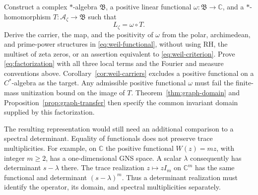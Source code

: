 \documentclass[11pt]{article}
\numberwithin{equation}{section}
\newcommand{\cA}{\mathcal A}
\newcommand{\C}{\mathbb C}
\begin{document}
\begin{openproblem}
Construct a complex $*$-algebra $\mathfrak B$, a positive linear
functional $\omega:\mathfrak B\to\C$, and a $*$-homomorphism
$T:\cA_\zeta\to\mathfrak B$ such that
\begin{equation}
 L_\zeta=\omega\circ T.
 \label{eq:factorization}
\end{equation}
Derive the carrier, the map, and the positivity of $\omega$ from the
polar, archimedean, and prime-power structures in
\eqref{eq:weil-functional}, without using RH, the multiset of zeta zeros,
or an assertion equivalent to \eqref{eq:weil-criterion}.  Prove
\eqref{eq:factorization} with all three local terms and the Fourier and
measure conventions above.  Corollary~\ref{cor:weil-carriers} excludes
a positive functional on a $C^*$-algebra as the target.
Any admissible positive functional $\omega$ must fail the finite-mass
unitization bound on the image of $T$.
Theorem~\ref{thm:graph-domain} and
Proposition~\ref{prop:graph-transfer} then specify the common invariant
domain supplied by this factorization.
\end{openproblem}

The resulting representation would still need an additional comparison
to a spectral determinant.  Equality of functionals does not preserve
trace multiplicities.  For example, on $\C$ the positive functional
$W(z)=mz$, with integer $m\geq2$, has a one-dimensional GNS space.
A scalar $\lambda$ consequently has determinant $s-\lambda$ there.
The trace realization $z\mapsto zI_m$ on $\C^m$ has the same functional
and determinant $(s-\lambda)^m$.  Thus a determinant realization must
identify the operator, its domain, and spectral multiplicities separately.
\end{document}
